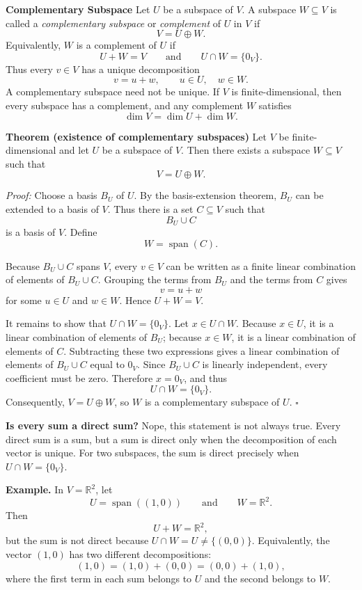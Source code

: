 \documentclass[a4paper,11pt,abstract=true]{scrartcl}
\theoremstyle{dotlessP}
\theoremstyle{dotlessS}
\theoremstyle{remark}
\theoremstyle{definition}
\begin{document}
\textbf{Complementary Subspace} Let $U$ be a subspace of $V$.
A subspace $W\subseteq V$ is called a \emph{complementary subspace} or
\emph{complement} of $U$ in $V$ if
\[
V=U\oplus W.
\]
Equivalently, $W$ is a complement of $U$ if
\[
U+W=V
\qquad\text{and}\qquad
U\cap W=\{0_V\}.
\]
Thus every $v\in V$ has a unique decomposition
\[
v=u+w,
\qquad u\in U,\quad w\in W.
\]
A complementary subspace need not be unique. If $V$ is finite-dimensional,
then every subspace has a complement, and any complement $W$ satisfies
\[
\dim V=\dim U+\dim W.
\]

\textbf{Theorem (existence of complementary subspaces)} Let $V$ be
finite-dimensional and let $U$ be a subspace of $V$. Then there exists a
subspace $W\subseteq V$ such that
\[
V=U\oplus W.
\]

\textit{Proof:} Choose a basis $B_U$ of $U$. By the basis-extension theorem,
$B_U$ can be extended to a basis of $V$. Thus there is a set $C\subseteq V$
such that
\[
B_U\cup C
\]
is a basis of $V$. Define
\[
W=\operatorname{span}(C).
\]

Because $B_U\cup C$ spans $V$, every $v\in V$ can be written as a finite
linear combination of elements of $B_U\cup C$. Grouping the terms from
$B_U$ and the terms from $C$ gives
\[
v=u+w
\]
for some $u\in U$ and $w\in W$. Hence $U+W=V$.

It remains to show that $U\cap W=\{0_V\}$. Let $x\in U\cap W$. Because
$x\in U$, it is a linear combination of elements of $B_U$; because
$x\in W$, it is a linear combination of elements of $C$. Subtracting these
two expressions gives a linear combination of elements of $B_U\cup C$ equal
to $0_V$. Since $B_U\cup C$ is linearly independent, every coefficient must
be zero. Therefore $x=0_V$, and thus
\[
U\cap W=\{0_V\}.
\]
Consequently, $V=U\oplus W$, so $W$ is a complementary subspace of $U$.
\hfill$\square$

\begin{remark_box}
\textbf{Is every sum a direct sum?} Nope, this statement is not always true. Every direct sum is a sum, but a sum
is direct only when the decomposition of each vector is unique. For two
subspaces, the sum is direct precisely when $U\cap W=\{0_V\}$.
\end{remark_box}

\begin{example_box}
\textbf{Example.} In $V=\mathbb{R}^2$, let
\[
U=\operatorname{span}((1,0))
\qquad\text{and}\qquad
W=\mathbb{R}^2.
\]
Then
\[
U+W=\mathbb{R}^2,
\]
but the sum is not direct because $U\cap W=U\neq\{(0,0)\}$. Equivalently,
the vector $(1,0)$ has two different decompositions:
\[
(1,0)=(1,0)+(0,0)=(0,0)+(1,0),
\]
where the first term in each sum belongs to $U$ and the second belongs to
$W$.
\end{example_box}
\end{document}
